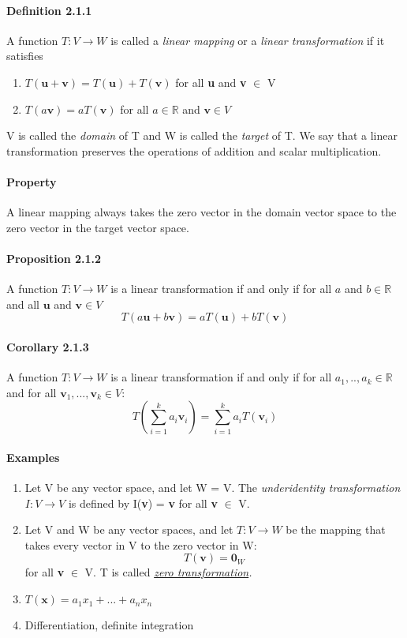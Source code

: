 \documentclass[11pt]{article}
\newcommand{\ti}[1]{\textit{#1}}
\newcommand{\tb}[1]{\textbf{#1}}
\newcommand{\mb}[1]{\mathbb{#1}}
\newcommand{\under}[1]{\underline{#1}}
\newcommand{\litran}[0]{$T: V \rightarrow W$ }
\begin{document}
	\paragraph{Definition 2.1.1} A function $T: V \rightarrow W$ is called a \ti{linear mapping} or a \ti{linear transformation} if it satisfies
	\begin{enumerate}
		\item $T(\tb{u} + \tb{v}) = T(\tb{u}) + T(\tb{v})$ for all \tb{u} and \tb{v} $\in$ V
		\item $T(a\tb{v}) = aT(\tb{v})$ for all $a \in \mb{R}$ and $\tb{v} \in V$
	\end{enumerate}
	V is called the \ti{domain} of T and W is called the \ti{target} of T. \newline
	We say that a linear transformation preserves the operations of addition and scalar multiplication.
	\paragraph{Property} A linear mapping always takes the zero vector in the domain vector space to the zero vector in the target vector space.
	\paragraph{Proposition 2.1.2} A function \litran is a linear transformation if and only if for all $a$ and $b \in \mb{R}$ and all $\tb{u}$ and $\tb{v} \in V$
	$$T(a\tb{u} + b\tb{v}) = aT(\tb{u}) + bT(\tb{v})$$
	\paragraph{Corollary 2.1.3} A function \litran is a linear transformation if and only if for all $a_1, .., a_k \in \mb{R}$ and for all $\tb{v}_1, ..., \tb{v}_k \in V$:
	$$T(\sum^k_{i = 1} a_i \tb{v}_i) = \sum^k_{i = 1}a_iT(\tb{v}_i)$$
	\paragraph{Examples}
	\begin{enumerate}
		\item Let V be any vector space, and let W = V. The \ti{under{identity transformation}} $I: V \rightarrow V$ is defined by I(\tb{v}) = \tb{v} for all \tb{v} $\in$ V.
		\item Let V and W be any vector spaces, and let \litran be the mapping that takes every vector in V to the zero vector in W:
		$$ T(\tb{v}) = \tb{0}_W$$
		for all \tb{v} $\in$ V. T is called \it{\under{zero transformation}}.
		\item $T(\tb{x}) = a_1x_1 + ... + a_nx_n$
		\item Differentiation, definite integration
	\end{enumerate} 
\end{document}
